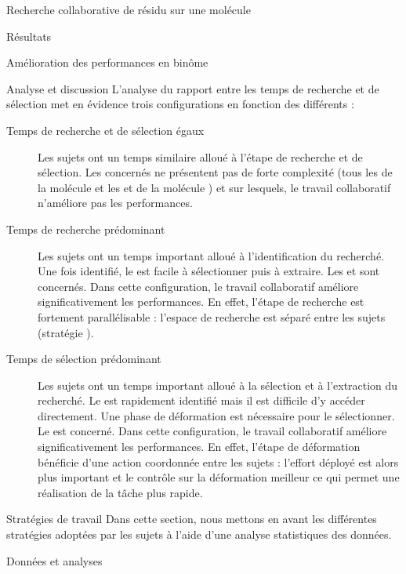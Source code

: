 \documentclass[myfrancais,ngerman,english,french]{mythesis}
\begin{document}
\begin{mychapter}{Recherche collaborative de résidu sur une molécule}
\begin{mysection}{Résultats}
\begin{mysubsection}{Amélioration des performances en binôme}
\begin{mysubsubsection}{Analyse et discussion}
					L'analyse du rapport entre les temps de recherche et de sélection met en évidence trois configurations en fonction des différents  :
					\begin{description}
						\item[Temps de recherche et de sélection égaux]
							Les sujets ont un temps similaire alloué à l'étape de recherche et de sélection.
							Les  concernés ne présentent pas de forte complexité (tous les  de la molécule \myTRPCAGE et les   et  de la molécule \myPrion) et sur lesquels, le travail collaboratif n'améliore pas les performances.
						\item[Temps de recherche prédominant]
							Les sujets ont un temps important alloué à l'identification du  recherché.
							Une fois identifié, le  est facile à sélectionner puis à extraire.
							Les   et  sont concernés.
							Dans cette configuration, le travail collaboratif améliore significativement les performances.
							En effet, l'étape de recherche est fortement parallélisable : l'espace de recherche est séparé entre les sujets (stratégie ).
						\item[Temps de sélection prédominant]
							Les sujets ont un temps important alloué à la sélection et à l'extraction du  recherché.
							Le  est rapidement identifié mais il est difficile d'y accéder directement.
							Une phase de déformation est nécessaire pour le sélectionner.
							Le   est concerné.
							Dans cette configuration, le travail collaboratif améliore significativement les performances.
							En effet, l'étape de déformation bénéficie d'une action coordonnée entre les sujets : l'effort déployé est alors plus important et le contrôle sur la déformation meilleur ce qui permet une réalisation de la tâche plus rapide.
					\end{description}
				\end{mysubsubsection}
			\end{mysubsection}
			\begin{mysubsection}{Stratégies de travail}
				Dans cette section, nous mettons en avant les différentes stratégies adoptées par les sujets à l'aide d'une analyse statistiques des données.
				\begin{mysubsubsection}{Données et analyses}

\end{mysubsubsection}
\end{mysubsection}
\end{mysection}
\end{mychapter}
\end{document}

